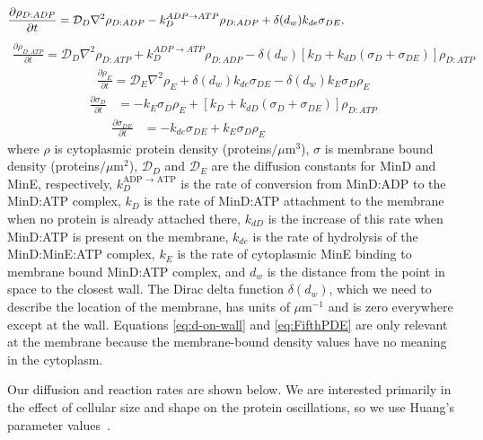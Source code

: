 \documentclass[10pt,letterpaper]{article}
\newcommand\micron{\ensuremath{\mu\text{m}}}
\begin{document}
\begin{align}
  \frac{\partial \rho_{D:ADP}}{\partial t} = \mathcal{D}_D\nabla^2\rho_{D:ADP}-k_D^{ADP\rightarrow ATP}\rho_{D:ADP}+\delta(d_w)k_{de}\sigma_{DE},\hspace{3.4cm}
\end{align}
\begin{align}
  \frac{\partial \rho_{D:ATP}}{\partial t} = \mathcal{D}_D\nabla^2\rho_{D:ATP}+k_D^{ADP\rightarrow ATP}\rho_{D:ADP}-\delta(d_w)[k_D+k_{dD}(\sigma_D+\sigma_{DE})]\rho_{D:ATP}
\end{align}
\begin{align}
  \frac{\partial \rho_E}{\partial t} = \mathcal{D}_E\nabla^2\rho_E+\delta(d_w)k_{de}\sigma_{DE}
  -\delta(d_w)k_E \sigma_D \rho_E
\end{align}
\begin{align}
  \frac{\partial \sigma_D}{\partial t} &= -k_E\sigma_D\rho_E
  +[k_D+k_{dD}(\sigma_D+\sigma_{DE})]\rho_{D:ATP}
  \label{eq:d-on-wall}
\end{align}
\begin{align}
  \frac{\partial \sigma_{DE}}{\partial t} &= -k_{de}\sigma_{DE}+k_E\sigma_D\rho_E\hspace{3cm}
  \label{eq:FifthPDE}
\end{align}
where $\rho$ is cytoplasmic protein density (proteins$/\micron^{3}$), $\sigma$
is membrane bound density (proteins$/\micron^{2}$), $\mathcal{D}_D$ and
$\mathcal{D}_{E}$ are the diffusion constants for MinD and MinE,
respectively, $k_D^{\textrm{ADP $\rightarrow$ ATP}}$ is the rate of
conversion from MinD:ADP to the MinD:ATP complex, $k_D$ is the rate of
MinD:ATP attachment to the membrane when no protein is already
attached there, $k_{dD}$ is the increase of this rate when MinD:ATP is
present on the membrane, $k_{de}$ is the rate of hydrolysis of the
MinD:MinE:ATP complex, $k_E$ is the rate of cytoplasmic MinE binding
to membrane bound MinD:ATP complex, and $d_w$ is the distance from the
point in space to the closest wall.  The Dirac delta function
$\delta(d_w)$, which we need to describe the location of the membrane,
has units of $\micron^{-1}$ and is zero everywhere except at the wall.
Equations \ref{eq:d-on-wall} and \ref{eq:FifthPDE} are only relevant
at the membrane because the membrane-bound density values have no
meaning in the cytoplasm.

Our diffusion and reaction rates are shown below.  We are interested
primarily in the effect of cellular size and shape on the protein
oscillations, so we use Huang's parameter
values~\cite{huang2003dynamic}.
\end{document}
